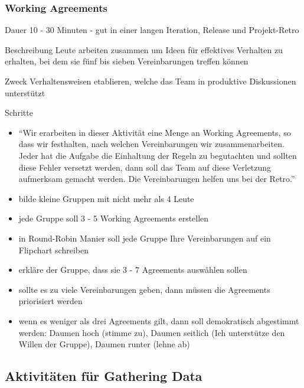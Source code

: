 \subsubsection{Working Agreements}
\begin{Beschreibungfett}[Beschreibung]
  \item [Dauer] 10 - 30 Minuten - gut in einer langen Iteration, Release und
    Projekt-Retro
  \item [Beschreibung] Leute arbeiten zusammen um Ideen für effektives Verhalten zu
    erhalten, bei dem sie fünf bis sieben Vereinbarungen treffen können
  \item [Zweck] Verhaltensweisen etablieren, welche das Team in produktive Diskussionen unterstützt
  \item [Schritte]
    \begin{itemize}
      \item \enquote{Wir erarbeiten in dieser Aktivität eine Menge an Working Agreements, so dass wir
        festhalten, nach welchen Vereinbarungen wir zusammenarbeiten. Jeder hat die Aufgabe die
        Einhaltung der Regeln zu begutachten und sollten diese Fehler versetzt werden, dann
        soll das Team auf diese Verletzung aufmerksam gemacht werden. Die Vereinbarungen helfen uns
        bei der Retro.}
      \item bilde kleine Gruppen mit nicht mehr als 4 Leute
      \item jede Gruppe soll 3 - 5 Working Agreements erstellen
      \item in Round-Robin Manier soll jede Gruppe Ihre Vereinbarungen auf ein Flipchart
        schreiben
      \item erkläre der Gruppe, dass sie 3 - 7 Agreements auswählen sollen
      \item sollte es zu viele Vereinbarungen geben, dann müssen die Agreements priorisiert
        werden
      \item wenn es weniger als drei Agreements gilt, dann soll demokratisch abgestimmt werden:
        Daumen hoch (stimme zu), Daumen seitlich (Ich unterstütze den Willen der Gruppe),
        Daumen runter (lehne ab)
    \end{itemize}
\end{Beschreibungfett}


\subsection{Aktivitäten für Gathering Data}


